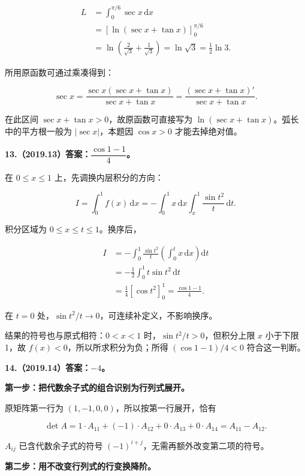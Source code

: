 \documentclass[UTF8,11pt,fontset=windows]{ctexart}
\begin{document}
$$
\begin{aligned}
L&=\int_0^{\pi/6}\sec x\,\mathrm dx\\
&=\left[\ln(\sec x+\tan x)\right]_0^{\pi/6}\\
&=\ln\left(\frac2{\sqrt3}+\frac1{\sqrt3}\right)
=\ln\sqrt3=\frac12\ln3.
\end{aligned}
$$

所用原函数可通过乘凑得到：

$$
\sec x=\frac{\sec x(\sec x+\tan x)}{\sec x+\tan x}
=\frac{(\sec x+\tan x)'}{\sec x+\tan x}.
$$

在此区间 $\sec x+\tan x>0$，故原函数可直接写为 $\ln(\sec x+\tan x)$。弧长中的平方根一般为 $|\sec x|$，本题因 $\cos x>0$ 才能去掉绝对值。

\clearpage

\textbf{13.（2019.13）答案：$\dfrac{\cos1-1}{4}$。}

在 $0\le x\le1$ 上，先调换内层积分的方向：

$$
I=\int_0^1f(x)\,\mathrm dx
=-\int_0^1x\,\mathrm dx\int_x^1\frac{\sin t^2}{t}\,\mathrm dt.
$$

积分区域为 $0\le x\le t\le1$。换序后，

$$
\begin{aligned}
I&=-\int_0^1\frac{\sin t^2}{t}\left(\int_0^t x\,\mathrm dx\right)\mathrm dt\\
&=-\frac12\int_0^1t\sin t^2\,\mathrm dt\\
&=\frac14\left[\cos t^2\right]_0^1
=\frac{\cos1-1}{4}.
\end{aligned}
$$

在 $t=0$ 处，$\sin t^2/t\to0$，可连续补定义，不影响换序。

结果的符号也与原式相符：$0<x<1$ 时，$\sin t^2/t>0$，但积分上限 $x$ 小于下限1，故 $f(x)<0$，所以所求积分为负；所得 $(\cos1-1)/4<0$ 符合这一判断。

\clearpage

\textbf{14.（2019.14）答案：$-4$。}

\textbf{第一步：把代数余子式的组合识别为行列式展开。}

原矩阵第一行为 $(1,-1,0,0)$，所以按第一行展开，恰有

$$
\det A=1\cdot A_{11}+(-1)\cdot A_{12}+0\cdot A_{13}+0\cdot A_{14}
=A_{11}-A_{12}.
$$

$A_{ij}$ 已含代数余子式的符号 $(-1)^{i+j}$，无需再额外改变第二项的符号。

\textbf{第二步：用不改变行列式的行变换降阶。}
\end{document}

